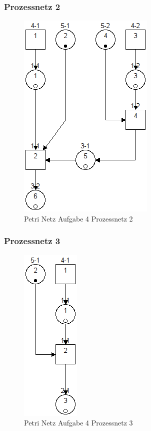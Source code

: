 \documentclass[10pt]{scrartcl}
\begin{document}
		\subsubsection{Prozessnetz 2}
			\begin{figure}[H]
    			\centering
				\includegraphics[]{aufg4Proc2.png}		
            	\caption{Petri Netz Aufgabe 4 Prozessnetz 2}
            	\label{petri:aufg4:pro2}
			\end{figure}		
		\subsubsection{Prozessnetz 3}
			\begin{figure}[H]
    			\centering
				\includegraphics[]{aufg4Proc3.png}		
            	\caption{Petri Netz Aufgabe 4 Prozessnetz 3}
            	\label{petri:aufg4:pro3}
			\end{figure}		
\end{document}
